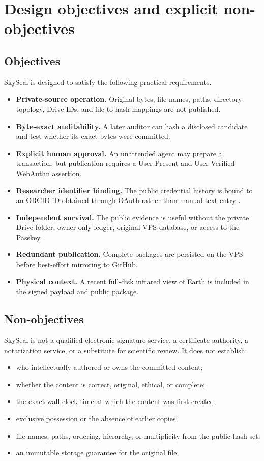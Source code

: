 \documentclass[11pt,a4paper]{article}
\begin{document}
\section{Design objectives and explicit non-objectives}

\subsection{Objectives}

SkySeal is designed to satisfy the following practical requirements.

\begin{itemize}
  \item \textbf{Private-source operation.} Original bytes, file names, paths, directory topology, Drive IDs, and file-to-hash mappings are not published.
  \item \textbf{Byte-exact auditability.} A later auditor can hash a disclosed candidate and test whether its exact bytes were committed.
  \item \textbf{Explicit human approval.} An unattended agent may prepare a transaction, but publication requires a User-Present and User-Verified WebAuthn assertion.
  \item \textbf{Researcher identifier binding.} The public credential history is bound to an ORCID iD obtained through OAuth rather than manual text entry \cite{orcid2026}.
  \item \textbf{Independent survival.} The public evidence is useful without the private Drive folder, owner-only ledger, original VPS database, or access to the Passkey.
  \item \textbf{Redundant publication.} Complete packages are persisted on the VPS before best-effort mirroring to GitHub.
  \item \textbf{Physical context.} A recent full-disk infrared view of Earth is included in the signed payload and public package.
\end{itemize}

\subsection{Non-objectives}

SkySeal is not a qualified electronic-signature service, a certificate authority, a notarization service, or a substitute for scientific review. It does not establish:

\begin{itemize}
  \item who intellectually authored or owns the committed content;
  \item whether the content is correct, original, ethical, or complete;
  \item the exact wall-clock time at which the content was first created;
  \item exclusive possession or the absence of earlier copies;
  \item file names, paths, ordering, hierarchy, or multiplicity from the public hash set;
  \item an immutable storage guarantee for the original file.
\end{itemize}
\end{document}
